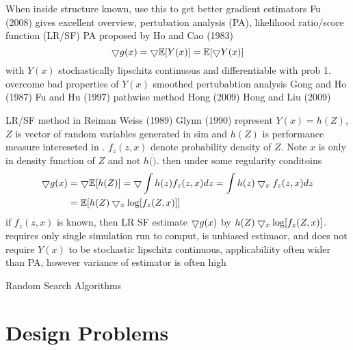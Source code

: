 When inside structure known, use this to get better gradient estimators
Fu (2008) gives excellent overview, pertubation analysis (PA), likelihood ratio/score function (LR/SF)
PA proposed by Ho and Cao (1983)
\begin{equation}
\bigtriangledown g(x) = \bigtriangledown \mathbb{E} [ Y(x) ] = \mathbb{E} [ \bigtriangledown Y (x) ] 
\end{equation}
with $Y(x)$ stochastically lipschitz continuous and differentiable with prob 1.
overcome bad properties of $Y(x)$
smoothed pertubabtion analysis Gong and Ho (1987) Fu and Hu (1997)
pathwise method Hong (2009) Hong and Liu (2009)

LR/SF method in Reiman Weiss (1989) Glynn (1990)
represent $Y(x) = h(Z)$, $Z$ is vector of random variables generated in sim and $h(Z)$ is performance measure intereseted in .  $f_z(z,x)$ denote probability density of $Z$.  Note $x$ is only in density function of $Z$ and not $h(\dot)$.
then under some regularity conditoins
\begin{align}
\bigtriangledown g(x) &= \bigtriangledown \mathbb{E} [ h(Z) ] = \bigtriangledown \int h(z) f_z(z,x) dz = \int h(z) \bigtriangledown_x f_z(z,x) dz \\
	&= \mathbb{E} [ h(Z) \bigtriangledown_x \log [ f_z(Z,x) ] ]
\end{align}
if $f_z(z,x)$ is known, then LR SF estimate $\bigtriangledown g(x)$ by $h(Z) \bigtriangledown_x \log [ f_z(Z,x) ]$. requires only single simulation run to comput, is unbiased estimaor, and does not require $Y(x)$ to be stochastic lipschitz continuous, applicabiliity often wider than PA, however variance of estimator is often high

Random Search Algorithms



\section{Design Problems}


